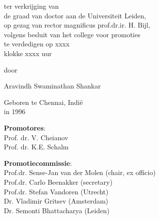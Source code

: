 \begin{titlepage}
\begin{center}
    
     {\large ter verkrijging van \\ de graad van doctor aan de Universiteit Leiden, \\ op gezag van rector magnificus prof.dr.ir. H. Bijl, \\ volgens besluit van het college voor promoties \\ te verdedigen op xxxx \\ klokke xxxx uur}
	
	\vspace{3\baselineskip} %
	
    {\large door}  %
    
    \vspace{3\baselineskip} %
    
	{\Large Aravindh Swaminathan Shankar}
    
    
    {\large Geboren te Chennai, Indi{\"e}\\in 1996}
    
	\vfill %
\end{center}

\clearpage
\thispagestyle{empty}

\medskip
\noindent \textbf{Promotores}:\\
Prof. dr. V. Cheianov\\
Prof. dr. K.E. Schalm 

\bigskip
\noindent \textbf{Promotiecommissie}: \\
Prof.dr. Sense-Jan van der Molen (chair, ex officio)\\
Prof.dr. Carlo Beenakker (secretary)\\
Prof.dr. Stefan Vandoren (Utrecht)\\
Dr. Vladimir Gritsev (Amsterdam)\\
Dr. Semonti Bhattacharya (Leiden)\\




\end{titlepage}
